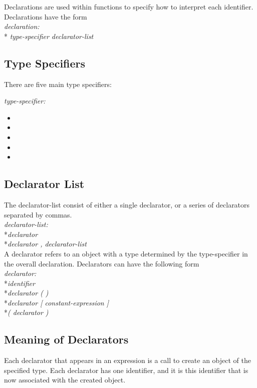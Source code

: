 Declarations are used within functions to specify how to interpret each identifier. Declarations have the form\\

	\textit{ declaration: }
		\\*\indent\indent\textit{ type-specifier declarator-list}

\subsection{Type Specifiers}

There are five main type specifiers:

	\textit{type-specifier: }
\begin{itemize}[~]
  \item \integ
  \item \float
  \item \complex
  \item \mat
  \item \qubit
\end{itemize}

\subsection{ Declarator List }
The declarator-list consist of either a single declarator, or a series of declarators separated by commas.\\

	\textit{declarator-list:}
		\\*\indent\indent\textit{declarator}
		\\*\indent\indent\textit{declarator , declarator-list}\\

A declarator refers to an object with a type determined by the type-specifier in the overall declaration. Declarators can have the following form\\

	\textit{declarator:}
		\\*\indent\indent\textit{identifier}
		\\*\indent\indent\textit{declarator ( )}
		\\*\indent\indent\textit{declarator [ constant-expression ]}
		\\*\indent\indent\textit{( declarator )}\\

\subsection{ Meaning of Declarators }
Each declarator that appears in an expression is a call to create an object of the specified type. Each declarator has one identifier, and it is this identifier that is now associated with the created object. 

